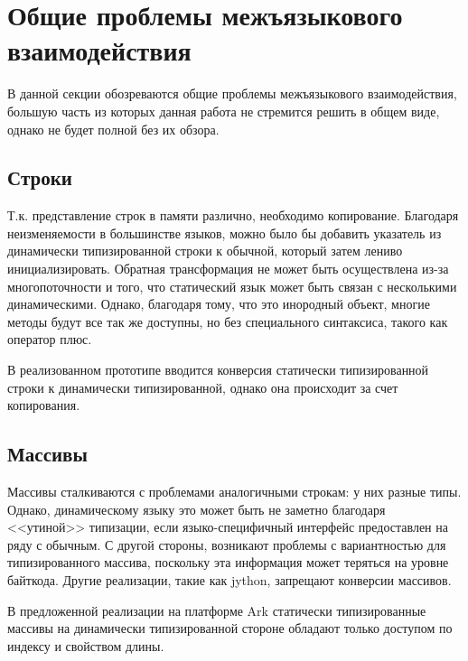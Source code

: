 \documentclass[times
]{itmo-student-thesis}
\begin{document}
\section{Общие проблемы межъязыкового взаимодействия}
В данной секции обозреваются общие проблемы межъязыкового взаимодействия, большую часть из которых данная работа не стремится решить в общем виде, однако не будет полной без их обзора.

\subsection{Строки}
Т.к. представление строк в памяти различно, необходимо копирование. Благодаря неизменяемости в большинстве языков, можно было бы добавить указатель из динамически типизированной строки к обычной, который затем лениво инициализировать. Обратная трансформация не может быть осуществлена из-за многопоточности и того, что статический язык может быть связан с несколькими динамическими. Однако, благодаря тому, что это инородный объект, многие методы будут все так же доступны, но без специального синтаксиса, такого как оператор плюс.

В реализованном прототипе вводится конверсия статически типизированной строки к динамически типизированной, однако она происходит за счет копирования.

\subsection{Массивы}
Массивы сталкиваются с проблемами аналогичными строкам: у них разные типы. Однако, динамическому языку это может быть не заметно благодаря <<утиной>> типизации, если языко-специфичный интерфейс предоставлен на ряду с обычным. С другой стороны, возникают проблемы с вариантностью для типизированного массива, поскольку эта информация может теряться на уровне байткода. Другие реализации, такие как jython, запрещают конверсии массивов.

В предложенной реализации на платформе Ark статически типизированные массивы на динамически типизированной стороне обладают только доступом по индексу и свойством длины.
\end{document}
